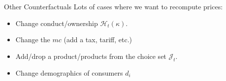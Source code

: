 \begin{frame}{Other Counterfactuals}
Lots of cases where we want to recompute prices:
\begin{itemize}
\item Change conduct/ownership $\mathcal{H}_t(\kappa)$.
\item Change the $mc$ (add a tax, tariff, etc.)
\item Add/drop a product/products from the choice set $\mathcal{J}_t$.
\item Change demographics of consumers $d_i$
\end{itemize}
\end{frame}










